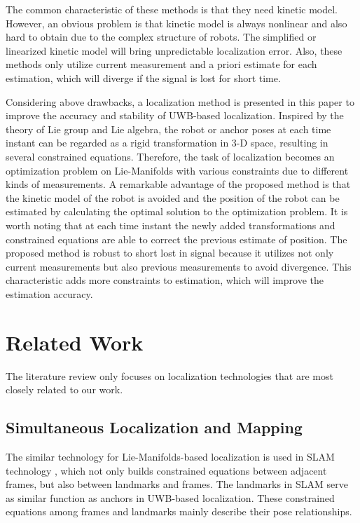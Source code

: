 \documentclass[journal]{IEEEtran}
\begin{document}
The common characteristic of these methods is that they need kinetic model. However, an obvious problem is that kinetic model is always nonlinear and also hard to obtain due to the complex structure of robots. The simplified or linearized kinetic model will bring unpredictable localization error. Also, these methods only utilize current measurement and a priori estimate for each estimation, which will diverge if the signal is lost for short time.  

Considering above drawbacks, a localization method is presented in this paper to improve the accuracy and stability of UWB-based localization. Inspired by the theory of Lie group and Lie algebra, the robot or anchor poses at each time instant can be regarded as a rigid transformation in 3-D space, resulting in several constrained equations. Therefore, the task of localization becomes an optimization problem on Lie-Manifolds with various constraints due to different kinds of measurements. A remarkable advantage of the proposed method is that the kinetic model of the robot is avoided and the position of the robot can be estimated by calculating the optimal solution to the optimization problem. It is worth noting that at each time instant the newly added transformations and constrained equations are able to correct the previous estimate of position. The proposed method is robust to short lost in signal because it utilizes not only current measurements but also previous measurements to avoid divergence. This characteristic adds more constraints to estimation, which will improve the estimation accuracy.

\section{Related Work}
\label{work}

The literature review only focuses on localization technologies that are most closely related to our work.

\subsection{Simultaneous Localization and Mapping}

The similar technology for Lie-Manifolds-based localization is used in SLAM technology \cite{Forster:U0j63nKN, Endres:2014ib,Engel:2017cg}, which not only builds constrained equations between adjacent frames, but also between landmarks and frames.  The landmarks in SLAM serve as similar function as anchors in UWB-based localization. These constrained equations among frames and landmarks mainly describe their pose relationships. 
\end{document}
